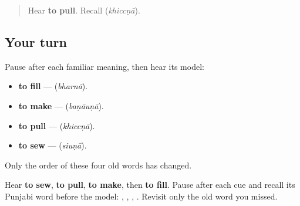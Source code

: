 \label{lesson:PA-R163-pull-again}



\begin{quote}
Hear \textbf{to pull}. Recall \textbf{} (\emph{khiccṇā}).
\end{quote}

\subsection*{Your turn}
Pause after each familiar meaning, then hear its model:

\begin{itemize}
\raggedright
  \item \textbf{to fill} — \textbf{} (\emph{bharnā}).
  \item \textbf{to make} — \textbf{} (\emph{baṇāuṇā}).
  \item \textbf{to pull} — \textbf{} (\emph{khiccṇā}).
  \item \textbf{to sew} — \textbf{} (\emph{siuṇā}).
\end{itemize}

Only the order of these four old words has changed.

\begin{tcolorbox}[breakable,colback=teal!4,colframe=teal!35!black,title={Before you move on}]
Hear \textbf{to sew}, \textbf{to pull}, \textbf{to make}, then \textbf{to fill}. Pause after each cue and recall its Punjabi word before the model: \textbf{}, \textbf{}, \textbf{}, \textbf{}. Revisit only the old word you missed.
\end{tcolorbox}

